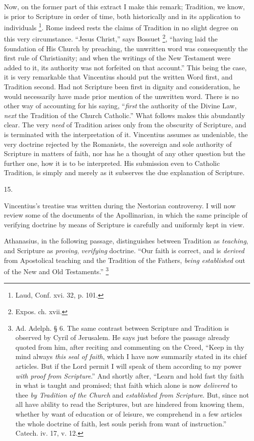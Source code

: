 Now, on the former part of this extract I make this remark;
Tradition, we know, is prior to Scripture in order of time, both
historically and in its application to individuals \footnote{Laud, Conf. xvi. 32, p. 101.}. Rome
indeed rests the claims of Tradition in no slight degree on this very
circumstance. ``Jesus Christ,'' says Bossuet \footnote{Expos. ch. xvii.},
``having laid the foundation of His Church by preaching, the
unwritten word was consequently the first rule of Christianity; and
when the writings of the New Testament were added to it, its authority
was not forfeited on that account.'' This being the case, it is
very remarkable that Vincentius should put the written Word first, and
Tradition second. Had not Scripture been first in dignity and
consideration, he would necessarily have made prior mention of the
unwritten word. There is no other way of accounting for his saying,
``\emph{first} the authority of the Divine Law, \emph{next} the
Tradition of the Church Catholic.'' What follows makes this
abundantly clear. The very \emph{need} of Tradition arises only from the
obscurity of Scripture, and is terminated with the interpretation of
it. Vincentius assumes as undeniable, the very doctrine rejected by
the Romanists, the sovereign and sole authority of Scripture in
matters of faith, nor has he a thought of any other question but the
further one, how it is to be interpreted. His submission even to
Catholic Tradition, is simply and merely as it subserves the due
explanation of Scripture.

15.

Vincentius's treatise was written during the Nestorian
controversy. I will now review some of the documents of the
Apollinarian, in which the same principle of verifying doctrine by
means of Scripture is carefully and uniformly kept in view.

Athanasius, in the following passage, distinguishes between
Tradition as \emph{teaching}, and Scripture as \emph{proving}, \emph{verifying}
doctrine. ``Our faith is correct, and is \emph{derived} from
Apostolical teaching and the Tradition of the Fathers, \emph{being
established} out of the New and Old Testaments.'' \footnote{Ad. Adelph. § 6. The same contrast between Scripture and
Tradition is observed by Cyril of Jerusalem. He says just before the
passage already quoted from him, after reciting and commenting on the
Creed, ``Keep in thy mind always \emph{this seal of faith}, which
I have now summarily stated in its chief articles. But if the Lord
permit I will speak of them according to my power \emph{with proof from
Scripture}.'' And shortly after, ``Learn and hold fast thy
faith in what is taught and promised; that faith which alone is now \emph{delivered} to thee \emph{by Tradition of the Church} and \emph{established
from Scripture}. But, since not all have ability to read the
Scriptures, but are hindered from knowing them, whether by want of
education or of leisure, we comprehend in a few articles the whole
doctrine of faith, lest souls perish from want of instruction.''
Catech. iv. 17, v. 12.}

